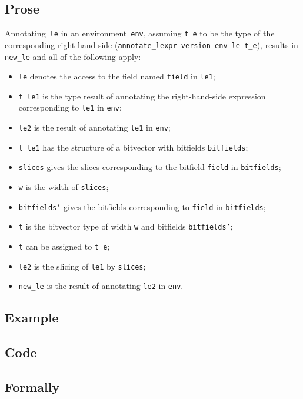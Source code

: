 \documentclass{book}
\begin{document}
    \subsection{Prose}
   Annotating~\texttt{le} in an environment~\texttt{env}, assuming
\texttt{t\_e} to be the type of the corresponding right-hand-side
(\texttt{annotate\_lexpr version env le t\_e}), results in \texttt{new\_le} and
all of the following apply:
   \begin{itemize}
   \item \texttt{le} denotes the access to the field named \texttt{field} in \texttt{le1};
   \item \texttt{t\_le1} is the type result of annotating the right-hand-side expression corresponding to \texttt{le1} in \texttt{env};
   \item \texttt{le2} is the result of annotating \texttt{le1} in \texttt{env};
   \item \texttt{t\_le1} has the structure of a bitvector with bitfields \texttt{bitfields};
   \item \texttt{slices} gives the slices corresponding to the bitfield \texttt{field} in
      \texttt{bitfields};
   \item \texttt{w} is the width of \texttt{slices};
   \item \texttt{bitfields'} gives the bitfields corresponding to \texttt{field} in \texttt{bitfields};
   \item \texttt{t} is the bitvector type of width \texttt{w} and bitfields \texttt{bitfields'};
   \item \texttt{t} can be assigned to \texttt{t\_e};
   \item \texttt{le2} is the slicing of \texttt{le1} by \texttt{slices};
   \item \texttt{new\_le} is the result of annotating \texttt{le2} in \texttt{env}.
   \end{itemize}

  \subsection{Example}

  \subsection{Code}

\begin{emptyformal}
    \subsection{Formally}
\end{emptyformal}
\end{document}
